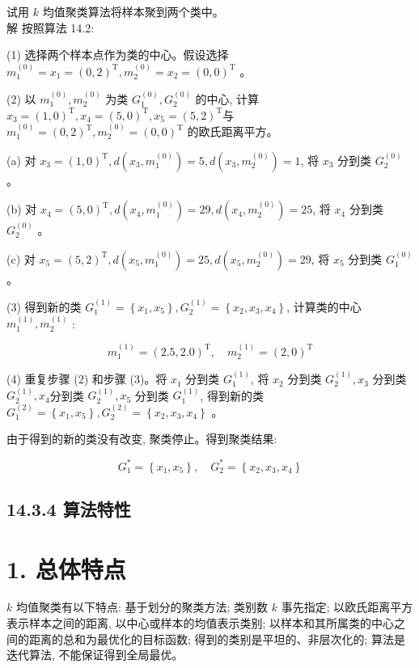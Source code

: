 \documentclass[10pt]{article}
\begin{document}
试用 $k$ 均值聚类算法将样本聚到两个类中。\\
解 按照算法 14.2:

(1) 选择两个样本点作为类的中心。假设选择 $m_{1}^{(0)}=x_{1}=(0,2)^{\mathrm{T}}, m_{2}^{(0)}=x_{2}=(0,0)^{\mathrm{T}}$ 。

(2) 以 $m_{1}^{(0)}, m_{2}^{(0)}$ 为类 $G_{1}^{(0)}, G_{2}^{(0)}$ 的中心, 计算 $x_{3}=(1,0)^{\mathrm{T}}, x_{4}=(5,0)^{\mathrm{T}}, x_{5}=(5,2)^{\mathrm{T}}$与 $m_{1}^{(0)}=(0,2)^{\mathrm{T}}, m_{2}^{(0)}=(0,0)^{\mathrm{T}}$ 的欧氏距离平方。

(a) 对 $x_{3}=(1,0)^{\mathrm{T}}, d\left(x_{3}, m_{1}^{(0)}\right)=5, d\left(x_{3}, m_{2}^{(0)}\right)=1$, 将 $x_{3}$ 分到类 $G_{2}^{(0)}$ 。

(b) 对 $x_{4}=(5,0)^{\mathrm{T}}, d\left(x_{4}, m_{1}^{(0)}\right)=29, d\left(x_{4}, m_{2}^{(0)}\right)=25$, 将 $x_{4}$ 分到类 $G_{2}^{(0)}$ 。

(c) 对 $x_{5}=(5,2)^{\mathrm{T}}, d\left(x_{5}, m_{1}^{(0)}\right)=25, d\left(x_{5}, m_{2}^{(0)}\right)=29$, 将 $x_{5}$ 分到类 $G_{1}^{(0)}$ 。

(3) 得到新的类 $G_{1}^{(1)}=\left\{x_{1}, x_{5}\right\}, G_{2}^{(1)}=\left\{x_{2}, x_{3}, x_{4}\right\}$, 计算类的中心 $m_{1}^{(1)}, m_{2}^{(1)}$ :

$$
m_{1}^{(1)}=(2.5,2.0)^{\mathrm{T}}, \quad m_{2}^{(1)}=(2,0)^{\mathrm{T}}
$$

(4) 重复步骤 (2) 和步骤 (3)。将 $x_{1}$ 分到类 $G_{1}^{(1)}$, 将 $x_{2}$ 分到类 $G_{2}^{(1)}, x_{3}$ 分到类 $G_{2}^{(1)}, x_{4}$分到类 $G_{2}^{(1)}, x_{5}$ 分到类 $G_{1}^{(1)}$, 得到新的类 $G_{1}^{(2)}=\left\{x_{1}, x_{5}\right\}, G_{2}^{(2)}=\left\{x_{2}, x_{3}, x_{4}\right\}$ 。

由于得到的新的类没有改变, 聚类停止。得到聚类结果:

$$
G_{1}^{*}=\left\{x_{1}, x_{5}\right\}, \quad G_{2}^{*}=\left\{x_{2}, x_{3}, x_{4}\right\}
$$

\subsection*{14.3.4 算法特性}
\section*{1. 总体特点}
$k$ 均值聚类有以下特点: 基于划分的聚类方法; 类别数 $k$ 事先指定; 以欧氏距离平方表示样本之间的距离, 以中心或样本的均值表示类别; 以样本和其所属类的中心之间的距离的总和为最优化的目标函数; 得到的类别是平坦的、非层次化的; 算法是迭代算法, 不能保证得到全局最优。
\end{document}
